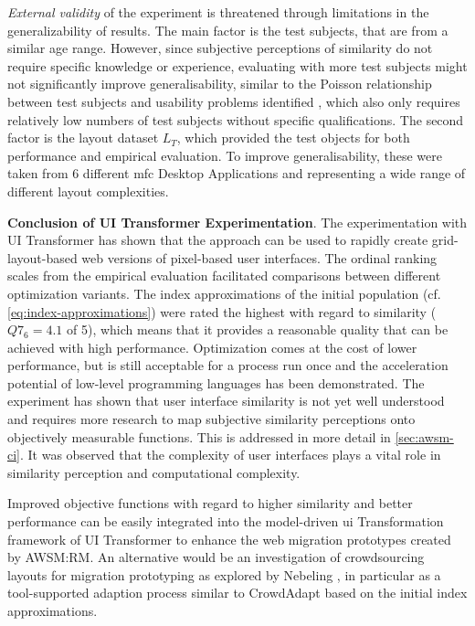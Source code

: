 \emph{External validity} of the experiment is threatened through limitations in the generalizability of results.
The main factor is the test subjects, that are from a similar age range.
However, since subjective perceptions of similarity do not require specific knowledge or experience, evaluating with more test subjects might not significantly improve generalisability, similar to the Poisson relationship between test subjects and usability problems identified \autocite{Nielsen1993}, which also only requires relatively low numbers of test subjects without specific qualifications.
The second factor is the  layout dataset \(L_T\), which provided the test objects for both performance and empirical evaluation.
To improve generalisability, these were taken from 6 different  \gls{mfc} \glspl{Desktop Application} and representing a wide range of different layout complexities.

\textbf{Conclusion of UI Transformer Experimentation}.
The experimentation with UI Transformer has shown that the approach can be used to rapidly create grid-layout-based \gls{web} versions of pixel-based  user interfaces.
The ordinal ranking scales from the empirical evaluation facilitated comparisons between different optimization variants.
The index approximations of the initial population (cf. \cref{eq:index-approximations}) were rated the highest with regard to similarity (\(Q7_6=4.1\) of 5), which means that it provides a reasonable quality that can be achieved with high performance.
Optimization comes at the cost of lower performance, but is still acceptable for a process run once and the acceleration potential of low-level programming languages has been demonstrated.
The experiment has shown that user interface similarity is not yet well understood and requires more research to map subjective similarity perceptions onto objectively measurable functions.
This is addressed in more detail in \cref{sec:awsm-ci}.
It was observed that the complexity of user interfaces plays a vital role in similarity perception and computational complexity.

Improved objective functions with regard to higher similarity and better performance can be easily integrated into the model-driven \gls{ui} \gls{Transformation} framework of UI Transformer to enhance the \glspl{web migration prototype} created by AWSM:RM.
An alternative would be an investigation of crowdsourcing layouts for \web migration prototyping as explored by Nebeling \autocite{Nebeling2012}, in particular as a tool-supported adaption process similar to CrowdAdapt \autocite{Nebeling2013CrowdAdapt} based on the initial index approximations.

